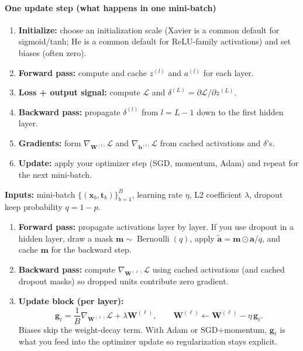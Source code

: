 \paragraph{One update step (what happens in one mini-batch)}

\begin{enumerate}
    \item \textbf{Initialize:} choose an initialization scale (Xavier is a common default for sigmoid/tanh; He is a common default for ReLU-family activations) and set biases (often zero).
    \item \textbf{Forward pass:} compute and cache \(z^{(l)}\) and \(a^{(l)}\) for each layer.
    \item \textbf{Loss + output signal:} compute \(\mathcal{L}\) and \(\delta^{(L)}=\partial\mathcal{L}/\partial z^{(L)}\).
    \item \textbf{Backward pass:} propagate \(\delta^{(l)}\) from \(l=L-1\) down to the first hidden layer.
    \item \textbf{Gradients:} form \(\nabla_{\mathbf{W}^{(l)}}\mathcal{L}\) and \(\nabla_{\mathbf{b}^{(l)}}\mathcal{L}\) from cached activations and \(\delta\)'s.
    \item \textbf{Update:} apply your optimizer step (SGD, momentum, Adam) and repeat for the next mini\hyp{}batch.
\end{enumerate}

\begin{tcolorbox}[summarybox, title={Mini\hyp{}batch backprop with explicit regularization}]
\textbf{Inputs:} mini\hyp{}batch \(\{(\mathbf{x}_b,\mathbf{t}_b)\}_{b=1}^B\), learning rate \(\eta\), L2 coefficient \(\lambda\), dropout keep probability \(q=1-p\).
\begin{enumerate}[leftmargin=*]
    \item \textbf{Forward pass:} propagate activations layer by layer. If you use dropout in a hidden layer, draw a mask \(\mathbf{m}\sim \operatorname{Bernoulli}(q)\), apply \(\tilde{\mathbf{a}}=\mathbf{m}\odot \mathbf{a}/q\), and cache \(\mathbf{m}\) for the backward step.
    \item \textbf{Backward pass:} compute \(\nabla_{\mathbf{W}^{(\ell)}} \mathcal{L}\) using cached activations (and cached dropout masks) so dropped units contribute zero gradient.
    \item \textbf{Update block (per layer):}
    \[
        \mathbf{g}_\ell = \frac{1}{B}\nabla_{\mathbf{W}^{(\ell)}} \mathcal{L} + \lambda \mathbf{W}^{(\ell)}, \qquad
        \mathbf{W}^{(\ell)} \leftarrow \mathbf{W}^{(\ell)} - \eta\, \mathbf{g}_\ell.
    \]
    Biases skip the weight-decay term. With Adam or SGD+momentum, \(\mathbf{g}_\ell\) is what you feed into the optimizer update so regularization stays explicit.
\end{enumerate}
\end{tcolorbox}

